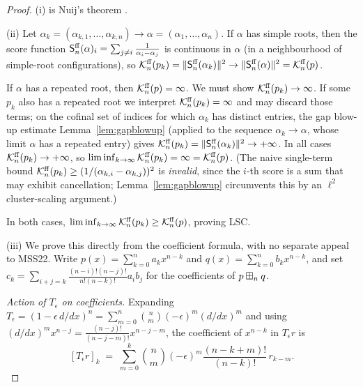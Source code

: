 \begin{proof}
(i) is Nuij's theorem \cite{Nuij}.

(ii) Let $\alpha_k=(\alpha_{k,1},\dots,\alpha_{k,n})\to\alpha=(\alpha_1,\dots,\alpha_n)$.
If $\alpha$ has simple roots, then the score function
$\mathsf{S}^{\mathrm{ff}}_n(\alpha)_i=\sum_{j\ne i}\frac{1}{\alpha_i-\alpha_j}$ is continuous in
$\alpha$ (in a neighbourhood of simple-root configurations), so
$\mathcal{K}^{\mathrm{ff}}_n(p_k)=\|\mathsf{S}^{\mathrm{ff}}_n(\alpha_k)\|^2\to\|\mathsf{S}^{\mathrm{ff}}_n(\alpha)\|^2=\mathcal{K}^{\mathrm{ff}}_n(p)$.

If $\alpha$ has a repeated root, then $\mathcal{K}^{\mathrm{ff}}_n(p)=\infty$. We must show
$\mathcal{K}^{\mathrm{ff}}_n(p_k)\to\infty$. If some $p_k$ also has a repeated root we interpret
$\mathcal{K}^{\mathrm{ff}}_n(p_k)=\infty$ and may discard those terms; on the cofinal set of indices
for which $\alpha_k$ has distinct entries, the gap blow-up estimate
Lemma~\ref{lem:gapblowup} (applied to the sequence $\alpha_k\to\alpha$, whose limit
$\alpha$ has a repeated entry) gives $\mathcal{K}^{\mathrm{ff}}_n(p_k)=\|\mathsf{S}^{\mathrm{ff}}_n(\alpha_k)\|^2\to+\infty$.
In all cases $\mathcal{K}^{\mathrm{ff}}_n(p_k)\to+\infty$, so
$\liminf_{k\to\infty}\mathcal{K}^{\mathrm{ff}}_n(p_k)=\infty=\mathcal{K}^{\mathrm{ff}}_n(p)$.
(The naive single-term bound $\mathcal{K}^{\mathrm{ff}}_n(p_k)\ge(1/(\alpha_{k,i}-\alpha_{k,j}))^2$ is
\emph{invalid}, since the $i$-th score is a sum that may exhibit cancellation;
Lemma~\ref{lem:gapblowup} circumvents this by an $\ell^2$ cluster-scaling argument.)

In both cases, $\liminf_{k\to\infty}\mathcal{K}^{\mathrm{ff}}_n(p_k)\ge\mathcal{K}^{\mathrm{ff}}_n(p)$, proving LSC.

(iii) We prove this directly from the coefficient formula, with no separate
appeal to MSS22.  Write $p(x)=\sum_{k=0}^n a_k x^{n-k}$ and
$q(x)=\sum_{k=0}^n b_k x^{n-k}$, and set
$c_k = \sum_{i+j=k}\frac{(n-i)!(n-j)!}{n!(n-k)!}a_i b_j$ for the
coefficients of $p\boxplus_n q$.

\smallskip\noindent\textit{Action of $T_\epsilon$ on coefficients.}
Expanding $T_\epsilon=(1-\epsilon\,d/dx)^n=\sum_{m=0}^n\binom{n}{m}(-\epsilon)^m(d/dx)^m$
and using $(d/dx)^m x^{n-j}=\tfrac{(n-j)!}{(n-j-m)!}x^{n-j-m}$, the
coefficient of $x^{n-k}$ in $T_\epsilon r$ is
\[
[T_\epsilon r]_k
\;=\;\sum_{m=0}^k \binom{n}{m}(-\epsilon)^m\frac{(n{-}k{+}m)!}{(n{-}k)!}\,r_{k-m}.
\]


\end{proof}
